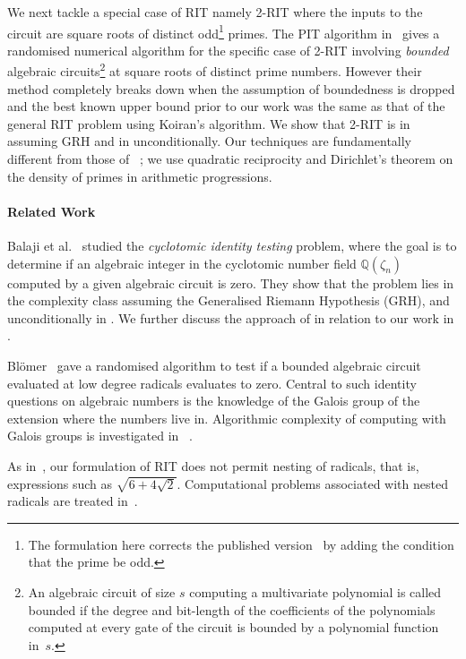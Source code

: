 We next tackle a special case of RIT namely 2-RIT where the inputs to the circuit are square roots of distinct odd\footnote{
The formulation here corrects the published version~\cite{lics-version} by adding the condition that the prime be odd.} primes. The {PIT} algorithm in~\cite{chen-kao} gives a randomised numerical algorithm for the specific case of 2-RIT involving \emph{bounded} algebraic circuits\footnote{An algebraic circuit of size $s$ computing a multivariate polynomial is called bounded if the degree and bit-length of the coefficients of the polynomials computed at every gate of the circuit is bounded by a polynomial
function in~$s$.} at square roots of distinct prime numbers. However their method completely breaks down when the assumption of boundedness is dropped and the best known upper bound prior to our work was the same as that of the general RIT problem using Koiran's algorithm. We show that 2-RIT is in {\coRP} assuming GRH and in {\coNP} unconditionally. Our techniques are fundamentally different from those of ~\cite{chen-kao};  we use quadratic reciprocity and Dirichlet's theorem on the density of primes in arithmetic progressions.

\paragraph{\bf Related Work}
Balaji et al.~\cite{balaji2021cyclotomic} studied the \emph{cyclotomic identity testing}  problem, where the goal is to determine if an algebraic integer in the cyclotomic number field $\mathbb{Q}(\zeta_n)$ computed by a given algebraic circuit is zero. They show that the problem lies in the complexity class {\bpp} assuming the Generalised Riemann Hypothesis (GRH), and unconditionally in {\coNP}.
We further discuss the approach of \cite{balaji2021cyclotomic} in relation to our work in .

Bl\"{o}mer~\cite{blomer98} gave a randomised algorithm to test if a bounded algebraic circuit evaluated at low degree radicals evaluates to zero. Central to such identity questions on algebraic numbers is the knowledge of the Galois group of the extension where the numbers live in. Algorithmic complexity of computing with Galois groups is investigated in ~\cite{landau-miller, landau, arvind-kurur}.

As in~\cite{blomer98}, our formulation of RIT does not permit nesting of radicals, that is, expressions such as $\sqrt{6+4\sqrt{2}}$.  Computational problems associated with nested radicals are treated in~\cite{Blomer92,Blomer97}.

